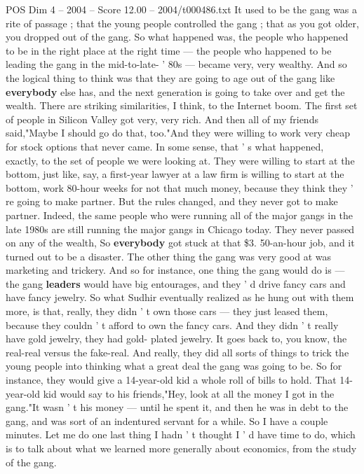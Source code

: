 \begin{textsample}{POS Dim 4 – 2004 – Score 12.00 – 2004/t000486.txt}
It used to be the gang was a rite of passage ; that the young people controlled the gang ; that as you got older, you dropped out of the gang.
So what happened was, the people who happened to be in the right place at the right time — the people who happened to be leading the gang in the mid-to-late- ' 80s — became very, very wealthy.
And so the logical thing to think was that they are going to age out of the gang like \textbf{everybody} else has, and the next generation is going to take over and get the wealth.
There are striking similarities, I think, to the Internet boom.
The first set of people in Silicon Valley got very, very rich.
And then all of my friends said,"Maybe I should go do that, too."And they were willing to work very cheap for stock options that never came.
In some sense, that ' s what happened, exactly, to the set of people we were looking at.
They were willing to start at the bottom, just like, say, a first-year lawyer at a law firm is willing to start at the bottom, work 80-hour weeks for not that much money, because they think they ' re going to make partner.
But the rules changed, and they never got to make partner.
Indeed, the same people who were running all of the major gangs in the late 1980s are still running the major gangs in Chicago today.
They never passed on any of the wealth, So \textbf{everybody} got stuck at that \$3. 50-an-hour job, and it turned out to be a disaster.
The other thing the gang was very good at was marketing and trickery.
And so for instance, one thing the gang would do is — the gang \textbf{leaders} would have big entourages, and they ' d drive fancy cars and have fancy jewelry.
So what Sudhir eventually realized as he hung out with them more, is that, really, they didn ' t own those cars — they just leased them, because they couldn ' t afford to own the fancy cars.
And they didn ' t really have gold jewelry, they had gold- plated jewelry.
It goes back to, you know, the real-real versus the fake-real.
And really, they did all sorts of things to trick the young people into thinking what a great deal the gang was going to be.
So for instance, they would give a 14-year-old kid a whole roll of bills to hold.
That 14-year-old kid would say to his friends,"Hey, look at all the money I got in the gang."It wasn ' t his money — until he spent it, and then he was in debt to the gang, and was sort of an indentured servant for a while.
So I have a couple minutes.
Let me do one last thing I hadn ' t thought I ' d have time to do, which is to talk about what we learned more generally about economics, from the study of the gang.

\end{textsample}
